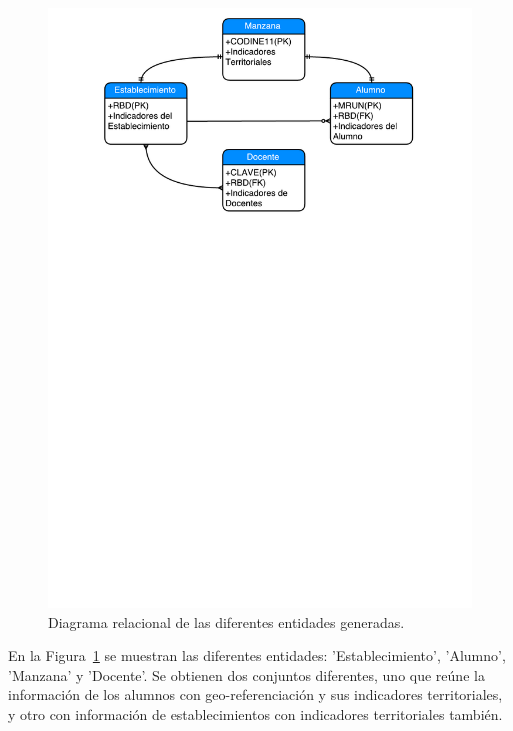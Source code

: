 \begin{figure}[H]
  \centering
    \includegraphics[trim=2cm 20cm 0cm 0cm,scale=0.9]{Figuras/6SolucionPropuesta/relacionDatos.pdf}
      \caption{Diagrama relacional de las diferentes entidades generadas.}
    \label{fig:rel}
\end{figure}

En la Figura~\ref{fig:rel} se muestran las diferentes entidades: 'Establecimiento', 'Alumno', 'Manzana' y 'Docente'. Se obtienen dos conjuntos diferentes, uno que reúne la información de los alumnos con geo-referenciación y sus indicadores territoriales, y otro con información de establecimientos con indicadores territoriales también.


